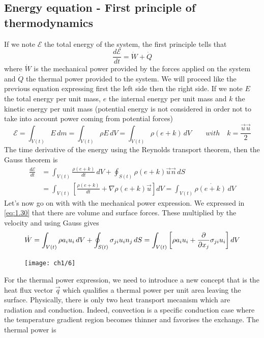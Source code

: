 	\subsection{Energy equation - First principle of thermodynamics}
		If we note $\mathcal{E}$ the total energy of the system, the first principle tells that
		\begin{equation}
			\frac{d\mathcal{E}}{dt} = \dot{W} + \dot{Q}
			\label{eq:1.38}
		\end{equation}
		where $\dot{W}$ is the mechanical power provided by the forces applied on the system and $\dot{Q}$ the thermal power provided to the system. We will proceed like the previous equation expressing first the left side then the right side. If we note $E$ the total energy per unit mass, $e$ the internal energy per unit mass and $k$ the kinetic energy per unit mass (potential energy is not considered in order not to take into account power coming from potential forces)
		\begin{equation}
			\mathcal{E} = \int _{V(t)} E\, dm = \int _{V(t)} \rho E \, dV = \int _{V(t)} \rho (e+k) \, dV \qquad with \quad k = \frac{\vec{u} \vec{u}}{2}
		\end{equation}
		The time derivative of the energy using the Reynolds transport theorem, then the Gauss theorem is 
		\begin{equation}
		\begin{aligned}
			\frac{d\mathcal{E}}{dt} &= \int _{V(t)} \frac{\rho (e+k)}{dt} \, dV + \oint _{S(t)} \rho (e+k)\vec{u} \vec{n} \, dS \\
			&= \int _{V(t)} \left[\frac{\rho (e+k)}{dt} + \nabla \rho (e+k)\vec{u}  \right] dV = \int _{V(t)} \rho \dot{(e+k)}\, dV 
		\end{aligned}
		\label{eq:1.40}
		\end{equation}
		Let's now go on with with the mechanical power expression. We expressed in \eqref{eq:1.30} that there are volume and surface forces. These multiplied by the velocity and using Gauss gives 
		\begin{equation}
			\dot{W} = \int _{V(t)} \rho a_i u_i \, dV + \oint _{S(t)} \sigma _{ji} u_i n_j \, dS = \int _{V(t)} \left[ \rho a_i u_i + \frac{\partial}{\partial x_j}\sigma _{ji} u_i\right] dV
			\label{eq:1.41}
		\end{equation}
		\begin{figure}
		\vspace{-5mm}
		\texttt{[image: ch1/6]}
		\end{figure}
		For the thermal power expression, we need to introduce a new concept that is the heat flux vector $\vec{q}$ which qualifies a thermal power per unit area leaving the surface. Physically, there is only two heat transport mecanism which are radiation and conduction. Indeed, convection is a specific conduction case where the temperature gradient region becomes thinner and favorises the exchange. The thermal power is 
